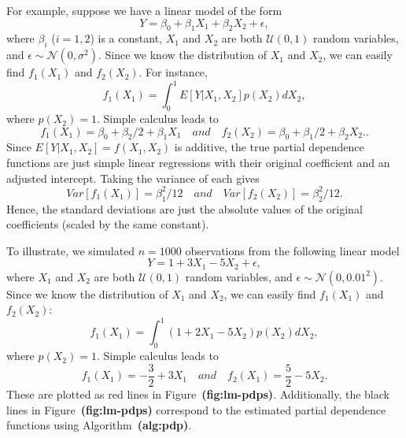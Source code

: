 \documentclass[12pt]{article}
\def\ref#1{\textbf{(#1)}}
\begin{document}
For example, suppose we have a linear model of the form
\begin{equation*}
  Y = \beta_0 + \beta_1 X_1 + \beta_2 X_2 + \epsilon,
\end{equation*}
where $\beta_i$ ($i = 1, 2$) is a constant, $X_1$ and $X_2$ are both $\mathcal{U}\left(0, 1\right)$ random variables, and $\epsilon \sim \mathcal{N}\left(0, \sigma ^ 2\right)$. Since we know the distribution of $X_1$ and $X_2$, we can easily find $f_1\left(X_1\right)$ and $f_2\left(X_2\right)$. For instance, 
\begin{equation*}
  f_1\left(X_1\right) = \int_0^1 E\left[Y | X_1, X_2\right] p\left(X_2\right) dX_2,
\end{equation*}
where $p\left(X_2\right) = 1$. Simple calculus leads to 
\begin{equation*}
  f_1\left(X_1\right) = \beta_0 + \beta_2 / 2 + \beta_1 X_1 \quad and \quad f_2\left(X_2\right) = \beta_0 + \beta_1 / 2 + \beta_2 X_2..
\end{equation*}
Since $E\left[Y | X_1, X_2\right] = f\left(X_1, X_2\right)$ is additive, the true partial dependence functions are just simple linear regressions with their original coefficient and an adjusted intercept. Taking the variance of each gives
\begin{equation*}
Var\left[f_1\left(X_1\right)\right] = \beta_1 ^ 2 / 12 \quad and \quad Var\left[f_2\left(X_2\right)\right] = \beta_2 ^ 2 / 12.
\end{equation*}
Hence, the standard deviations are just the absolute values of the original coefficients (scaled by the same constant).

To illustrate, we simulated $n = 1000$ observations from the following linear model
\begin{equation*}
  Y = 1 + 3 X_1 - 5 X_2 + \epsilon,
\end{equation*}
where $X_1$ and $X_2$ are both $\mathcal{U}\left(0, 1\right)$ random variables, and $\epsilon \sim \mathcal{N}\left(0, 0.01 ^ 2\right)$. Since we know the distribution of $X_1$ and $X_2$, we can easily find $f_1\left(X_1\right)$ and $f_2\left(X_2\right)$:
\begin{equation*}
f_1\left(X_1\right) = \int_0^1\left(1 + 2 X_1 - 5 X_2\right)p\left(X_2\right)dX_2,
\end{equation*}
where $p\left(X_2\right) = 1$. Simple calculus leads to 
\begin{equation*}
  f_1\left(X_1\right) = -\frac{3}{2} + 3 X_1 \quad and \quad f_2\left(X_1\right) = \frac{5}{2} - 5 X_2.
\end{equation*}
These are plotted as red lines in Figure~\ref{fig:lm-pdps}. Additionally, the black lines in Figure~\ref{fig:lm-pdps} correspond to the estimated partial dependence functions using Algorithm~\ref{alg:pdp}.
\end{document}
